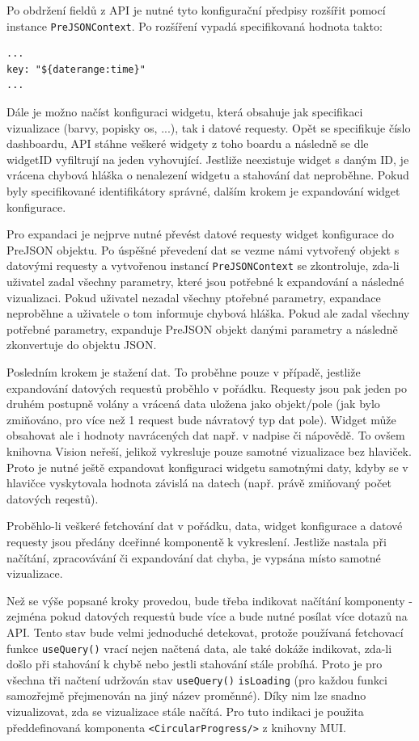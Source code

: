 \documentclass[czech, bc, kiv, he, iso690numb]{fasthesis}
\begin{document}
Po obdržení fieldů z API je nutné tyto konfigurační předpisy rozšířit pomocí instance \texttt{PreJSONContext}. Po rozšíření vypadá specifikovaná hodnota takto:
\lstset{style=plainsrc}
\begin{lstlisting}
...
key: "${daterange:time}"
...
\end{lstlisting}

Dále je možno načíst konfiguraci widgetu, která obsahuje jak specifikaci vizualizace (barvy, popisky os, ...), tak i datové requesty. Opět se specifikuje číslo dashboardu, API stáhne veškeré widgety z toho boardu a následně se dle widgetID vyfiltrují na jeden vyhovující. Jestliže
neexistuje widget s daným ID, je vrácena chybová hláška o nenalezení widgetu a stahování dat neproběhne. Pokud byly specifikované identifikátory správné, dalším krokem je expandování
widget konfigurace. 

Pro expandaci je nejprve nutné převést datové requesty widget konfigurace do PreJSON objektu. Po úspěšné převedení dat se vezme námi vytvořený objekt s datovými requesty a vytvořenou instancí \texttt{PreJSONContext} se zkontroluje, zda-li uživatel zadal všechny parametry, které jsou
potřebné k expandování a následné vizualizaci. Pokud uživatel nezadal všechny ptořebné parametry, expandace neproběhne a uživatele o tom informuje chybová hláška. Pokud ale zadal 
všechny potřebné parametry, expanduje PreJSON objekt danými parametry a následně zkonvertuje do objektu JSON.

Posledním krokem je stažení dat. To proběhne pouze v případě, jestliže expandování datových requestů proběhlo v pořádku. Requesty jsou pak jeden po druhém postupně volány a vrácená data
uložena jako objekt/pole (jak bylo zmiňováno, pro více než 1 request bude návratový typ dat pole). Widget může obsahovat ale i hodnoty navrácených dat např. v nadpise či nápovědě.
To ovšem knihovna Vision neřeší, jelikož vykresluje pouze samotné vizualizace bez hlaviček. Proto je nutné ještě expandovat konfiguraci widgetu samotnými daty, kdyby se v hlavičce vyskytovala
hodnota závislá na datech (např. právě zmiňovaný počet datových reqestů). 

Proběhlo-li veškeré fetchování dat v pořádku, data, widget konfigurace a datové requesty jsou předány dceřinné komponentě k vykreslení. Jestliže nastala při načítání, zpracovávání či expandování dat
chyba, je vypsána místo samotné vizualizace. 

Než se výše popsané kroky provedou, bude třeba indikovat načítání komponenty - zejména pokud datových requestů bude více a bude nutné posílat více dotazů na API. Tento stav bude velmi jednoduché 
detekovat, protože používaná fetchovací funkce \texttt{useQuery()} vrací nejen načtená data, ale také dokáže indikovat, zda-li došlo při stahování k chybě nebo jestli stahování stále probíhá. Proto
je pro všechna tři načtení udržován stav \texttt{useQuery()} \texttt{isLoading} (pro každou funkci samozřejmě přejmenován na jiný název proměnné). Díky nim lze snadno vizualizovat, zda se vizualizace stále načítá.
Pro tuto indikaci je použita předdefinovaná komponenta \texttt{<CircularProgress/>} z knihovny MUI.
\end{document}
